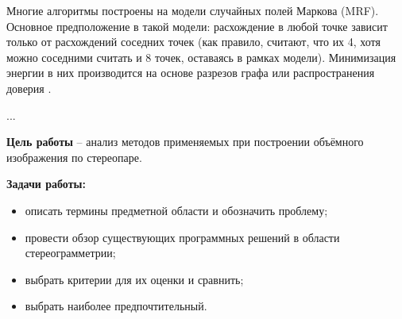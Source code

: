 Многие алгоритмы построены на модели случайных полей Маркова (MRF). Основное предположение в такой модели: расхождение в любой точке зависит только от расхождений соседних точек
(как правило, считают, что их 4, хотя можно соседними считать
и 8 точек, оставаясь в рамках модели). Минимизация энергии в
них производится на основе разрезов графа или распространения
доверия \cite{10}.

...

\textbf{Цель работы} – анализ методов применяемых при построении объёмного изображения по стереопаре.

\textbf{Задачи работы:}
\begin{itemize}
	\item описать термины предметной области и обозначить проблему;
	\item провести обзор существующих программных решений в области стереограмметрии;
	\item выбрать критерии для их оценки и сравнить;
	\item выбрать наиболее предпочтительный.
\end{itemize}
